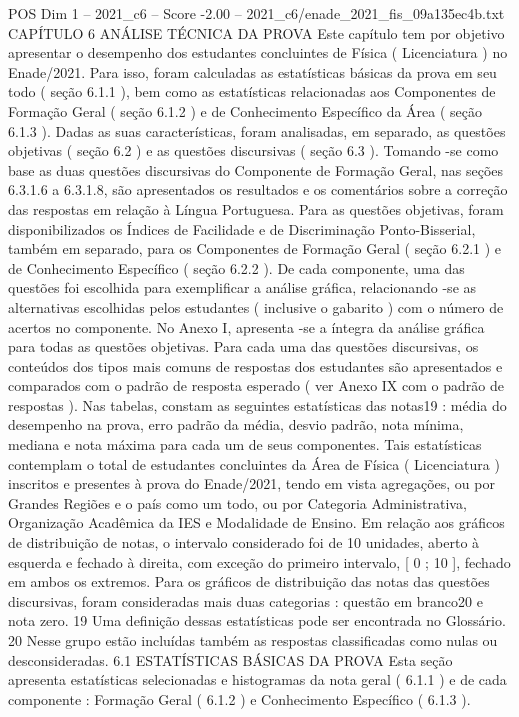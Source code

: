 \begin{textsample}{POS Dim 1 – 2021\_c6 – Score -2.00 – 2021\_c6/enade\_2021\_fis\_09a135ec4b.txt}  \label{ex:f1_pos_204}
CAPÍTULO 6 ANÁLISE TÉCNICA DA PROVA Este capítulo tem por objetivo apresentar o desempenho dos estudantes concluintes de Física ( Licenciatura ) no Enade/2021.
Para isso, foram calculadas as estatísticas básicas da prova em seu todo ( seção 6.1.1 ), bem como as estatísticas relacionadas aos Componentes de Formação Geral ( seção 6.1.2 ) e de Conhecimento Específico da Área ( seção 6.1.3 ).
Dadas as suas características, foram analisadas, em separado, as questões objetivas ( seção 6.2 ) e as questões discursivas ( seção 6.3 ).
Tomando -se como base as duas questões discursivas do Componente de Formação Geral, nas seções 6.3.1.6 a 6.3.1.8, são apresentados os resultados e os comentários sobre a correção das respostas em relação à Língua Portuguesa.
Para as questões objetivas, foram disponibilizados os Índices de Facilidade e de Discriminação Ponto-Bisserial, também em separado, para os Componentes de Formação Geral ( seção 6.2.1 ) e de Conhecimento Específico ( seção 6.2.2 ).
De cada componente, uma das questões foi escolhida para exemplificar a análise gráfica, relacionando -se as alternativas escolhidas pelos estudantes ( inclusive o gabarito ) com o número de acertos no componente.
No Anexo I, apresenta -se a íntegra da análise gráfica para todas as questões objetivas.
Para cada uma das questões discursivas, os conteúdos dos tipos mais comuns de respostas dos estudantes são apresentados e comparados com o padrão de resposta esperado ( ver Anexo IX com o padrão de respostas ).
Nas tabelas, constam as seguintes estatísticas das notas19 : média do desempenho na prova, erro padrão da média, desvio padrão, nota mínima, mediana e nota máxima para cada um de seus componentes.
Tais estatísticas contemplam o total de estudantes concluintes da Área de Física ( Licenciatura ) inscritos e presentes à prova do Enade/2021, tendo em vista agregações, ou por Grandes Regiões e o país como um todo, ou por Categoria Administrativa, Organização Acadêmica da IES e Modalidade de Ensino.
Em relação aos gráficos de distribuição de notas, o intervalo considerado foi de 10 unidades, aberto à esquerda e fechado à direita, com exceção do primeiro intervalo, [ 0 ; 10 ], fechado em ambos os extremos.
Para os gráficos de distribuição das notas das questões discursivas, foram consideradas mais duas categorias : questão em branco20 e nota zero. 19 Uma definição dessas estatísticas pode ser encontrada no Glossário. 20 Nesse grupo estão incluídas também as respostas classificadas como nulas ou desconsideradas. 6.1 ESTATÍSTICAS BÁSICAS DA PROVA Esta seção apresenta estatísticas selecionadas e histogramas da nota geral ( 6.1.1 ) e de cada componente : Formação Geral ( 6.1.2 ) e Conhecimento Específico ( 6.1.3 ).

\end{textsample}
